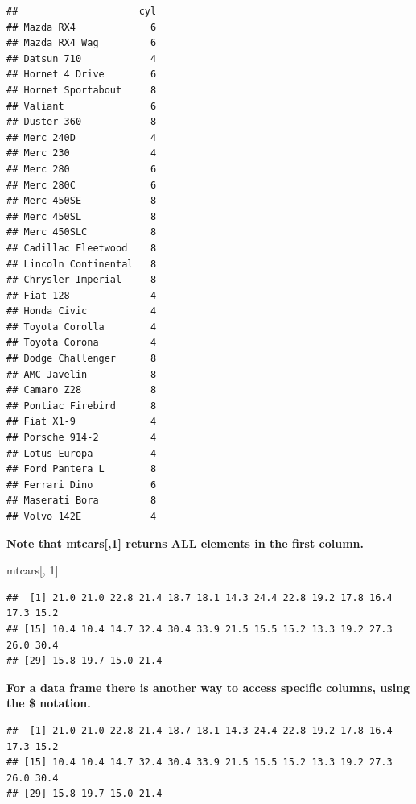 \documentclass[]{article}
\newenvironment{Shaded}{\begin{snugshade}}{\end{snugshade}}
\newcommand{\DecValTok}[1]{\textcolor[rgb]{0.00,0.00,0.81}{#1}}
\newcommand{\OperatorTok}[1]{\textcolor[rgb]{0.81,0.36,0.00}{\textbf{#1}}}
\newcommand{\NormalTok}[1]{#1}
\begin{document}
\begin{verbatim}
##                     cyl
## Mazda RX4             6
## Mazda RX4 Wag         6
## Datsun 710            4
## Hornet 4 Drive        6
## Hornet Sportabout     8
## Valiant               6
## Duster 360            8
## Merc 240D             4
## Merc 230              4
## Merc 280              6
## Merc 280C             6
## Merc 450SE            8
## Merc 450SL            8
## Merc 450SLC           8
## Cadillac Fleetwood    8
## Lincoln Continental   8
## Chrysler Imperial     8
## Fiat 128              4
## Honda Civic           4
## Toyota Corolla        4
## Toyota Corona         4
## Dodge Challenger      8
## AMC Javelin           8
## Camaro Z28            8
## Pontiac Firebird      8
## Fiat X1-9             4
## Porsche 914-2         4
## Lotus Europa          4
## Ford Pantera L        8
## Ferrari Dino          6
## Maserati Bora         8
## Volvo 142E            4
\end{verbatim}

\textbf{Note that mtcars{[},1{]} returns ALL elements in the first
column.}

\begin{Shaded}
\begin{Highlighting}[]
\NormalTok{mtcars[, }\DecValTok{1}\NormalTok{]}
\end{Highlighting}
\end{Shaded}

\begin{verbatim}
##  [1] 21.0 21.0 22.8 21.4 18.7 18.1 14.3 24.4 22.8 19.2 17.8 16.4 17.3 15.2
## [15] 10.4 10.4 14.7 32.4 30.4 33.9 21.5 15.5 15.2 13.3 19.2 27.3 26.0 30.4
## [29] 15.8 19.7 15.0 21.4
\end{verbatim}

\textbf{For a data frame there is another way to access specific
columns, using the \$ notation.}

\begin{Shaded}
\end{Shaded}

\begin{verbatim}
##  [1] 21.0 21.0 22.8 21.4 18.7 18.1 14.3 24.4 22.8 19.2 17.8 16.4 17.3 15.2
## [15] 10.4 10.4 14.7 32.4 30.4 33.9 21.5 15.5 15.2 13.3 19.2 27.3 26.0 30.4
## [29] 15.8 19.7 15.0 21.4
\end{verbatim}
\end{document}
